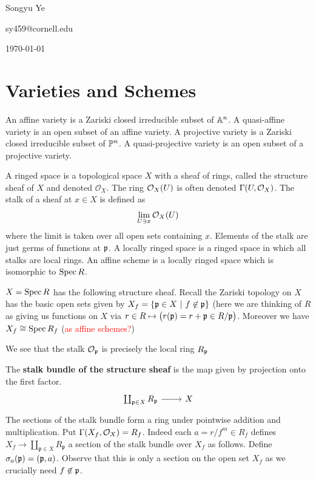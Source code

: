 \documentclass[12pt]{article}
\begin{document}
Songyu Ye 

sy459@cornell.edu

\today
\section{Varieties and Schemes}
\begin{definition}
An affine variety is a Zariski closed irreducible subset of $\A^n$. A quasi-affine variety is an open subset of an affine variety. A projective variety is a Zariski closed irreducible subset of $\P^n$. A quasi-projective variety is an open subset of a projective variety.
\end{definition}
\begin{definition}
A ringed space is a topological space $X$ with a sheaf of rings, called the structure sheaf of $X$ and denoted $\mathcal{O}_X$. The ring $\mc{O}_X(U)$ is often denoted $\Gamma(U,\mc{O}_X)$. The stalk of a sheaf at $x\in X$ is defined as \begin{align}
    \lim_{U\ni x}\mc{O}_X(U)
\end{align} where the limit is taken over all open sets containing $x$. Elements of the stalk are just germs of functions at $\mfp$. A locally ringed space is a ringed space in which all stalks are local rings. An affine scheme is a locally ringed space which is isomorphic to $\Spec R$. 
\end{definition}

$X = \Spec R$ has the following structure sheaf. Recall the Zariski topology on $X$ has the basic open sets given by $X_f = \{\mathfrak{p} \in X \st f\not\in\mfp\}$ (here we are thinking of $R$ as giving us functions on $X$ via $r\in R\mapsto \big(r(\mfp) = r + \mfp \in R/\mfp\big)$. Moreover we have $X_f\cong \Spec R_f$ (\textcolor{red}{as affine schemes?})

\hfill

We see that the stalk $\mc{O}_\mfp$ is precisely the local ring $R_\mfp$ 

\begin{definition}
The\textbf{ stalk bundle of the structure sheaf} is the map given by projection onto the first factor.
\[\begin{tikzcd}
	{\coprod_{\mathfrak{p}\in X}R_{\mathfrak{p}}} & X
	\arrow[from=1-1, to=1-2]
\end{tikzcd}\]
The sections of the stalk bundle form a ring under pointwise addition and multiplication. Put $\Gamma(X_f,\mc{O}_X) = R_f$. Indeed each $a = r/f^m\in R_f$ defines $X_f\to \coprod_{\mathfrak{p}\in X}R_{\mathfrak{p}}$ a section of the stalk bundle over $X_f$ as follows. Define $\sigma_a(\mfp) = (\mfp,a)$. Observe that this is only a section on the open set $X_f$ as we crucially need $f\not\in\mfp$.
\end{definition}
\end{document}
